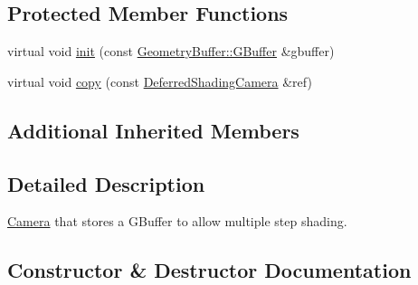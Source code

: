 \subsection*{Protected Member Functions}
\begin{DoxyCompactItemize}
\item 
virtual void \mbox{\hyperlink{class_geometry_engine_1_1_geometry_world_item_1_1_geometry_camera_1_1_deferred_shading_camera_a36c689377af8038020678a37535870c8}{init}} (const \mbox{\hyperlink{class_geometry_engine_1_1_geometry_buffer_1_1_g_buffer}{Geometry\+Buffer\+::\+G\+Buffer}} \&gbuffer)
\item 
virtual void \mbox{\hyperlink{class_geometry_engine_1_1_geometry_world_item_1_1_geometry_camera_1_1_deferred_shading_camera_a00eba99af30625646ea11f442ffa2742}{copy}} (const \mbox{\hyperlink{class_geometry_engine_1_1_geometry_world_item_1_1_geometry_camera_1_1_deferred_shading_camera}{Deferred\+Shading\+Camera}} \&ref)
\end{DoxyCompactItemize}
\subsection*{Additional Inherited Members}


\subsection{Detailed Description}
\mbox{\hyperlink{class_geometry_engine_1_1_geometry_world_item_1_1_geometry_camera_1_1_camera}{Camera}} that stores a G\+Buffer to allow multiple step shading. 

\subsection{Constructor \& Destructor Documentation}
\mbox{\label{class_geometry_engine_1_1_geometry_world_item_1_1_geometry_camera_1_1_deferred_shading_camera_a5efe7bec9b35953fe0ab0abf92a55248}} 
